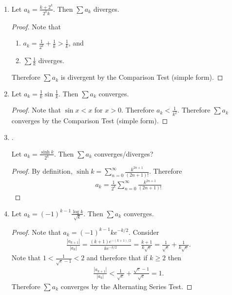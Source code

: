 \documentclass[12pt]{article}
\begin{document}
\begin{enumerate}[label=(\alph*)]
\item
  \begin{claim*}
    Let $a_k = \frac{k + 2^k}{2^kk}$. Then $\sum a_k$ diverges.
  \end{claim*}
  \begin{proof}
    Note that
    \begin{enumerate}
    \item $a_k = \frac{1}{2^k} + \frac{1}{k} > \frac{1}{k}$, and
    \item $\sum \frac{1}{k}$ diverges.
    \end{enumerate}
    Therefore $\sum a_k$ is divergent by the Comparison Test (simple form).
  \end{proof}
\item
  \begin{claim*}
    Let $a_k = \frac{1}{k}\sin\frac{1}{k}$. Then $\sum a_k$ converges.
  \end{claim*}
  \begin{proof}
    Note that $\sin x < x$ for $x > 0$. Therefore $a_k < \frac{1}{k^2}$. Therefore $\sum a_k$
    converges by the Comparison Test (simple form).
  \end{proof}
\item {}.
  \begin{claim*}
    Let $a_k = \frac{\sinh k}{2^k}$. Then $\sum a_k$ converges/diverges?
  \end{claim*}
  \begin{proof}
    By definition, $\sinh k = \sum_{n=0}^\infty \frac{k^{2n+1}}{(2n+1)!}$. Therefore
    \begin{align*}
      a_k = \frac{1}{2^k}\sum_{n=0}^\infty \frac{k^{2n+1}}{(2n+1)!}
    \end{align*}
  \end{proof}
\newpage
\item
  \begin{claim*}
    Let $a_k = (-1)^{k-1}\frac{\log k}{\sqrt k}$. Then $\sum a_k$ converges.
  \end{claim*}
  \begin{proof}
    Note that $a_k = (-1)^{k-1}ke^{-k/2}$. Consider
    \begin{align*}
      \frac{|a_{k+1}|}{|a_k|}
      = \frac{(k+1)e^{-(k+1)/2}}{ke^{-k/2}}
      = \frac{k+1}{k\sqrt{e}}
      = \frac{1}{\sqrt{e}} + \frac{1}{k\sqrt{e}}.
    \end{align*}
    Note that $1 < \frac{1}{\sqrt{e} - 1} < 2$ and therefore that if $k \geq 2$ then
    \begin{align*}
      \frac{|a_{k+1}|}{|a_k|}
      < \frac{1}{\sqrt{e}} + \frac{\sqrt{e} - 1}{\sqrt{e}}
      = 1.
    \end{align*}
    Therefore $\sum a_k$ converges by the Alternating Series Test.


\end{proof}
\end{enumerate}
\end{document}
